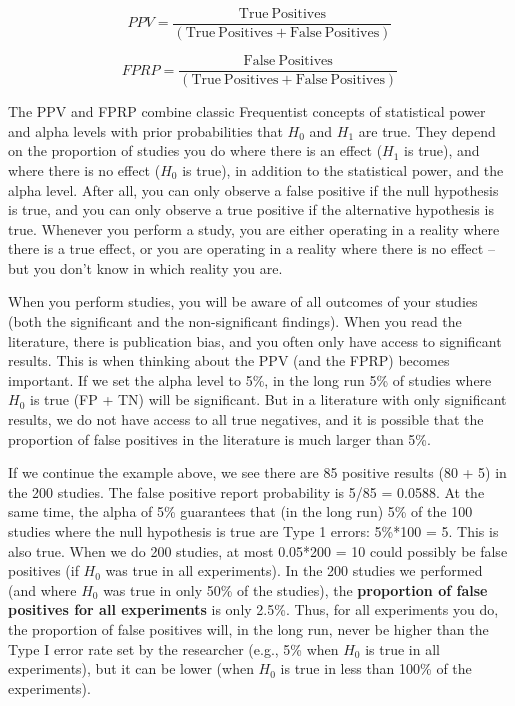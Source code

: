 \documentclass[
  oneside]{krantz}
\begin{document}
\[PPV = \frac{\text{True}\ \text{Positives}}{(\text{True}\ \text{Positives} +
                                                \text{False}\ \text{Positives})}\]

\[FPRP = \frac{\text{False}\ \text{Positives}}{(\text{True}\ \text{Positives}
                                                  + \text{False}\ \text{Positives})}\]

The PPV and FPRP combine classic Frequentist concepts of statistical power and alpha levels with prior probabilities that \(H_0\) and \(H_1\) are true. They depend on the proportion of studies you do where there is an effect (\(H_1\) is true), and where there is no effect (\(H_0\) is true), in addition to the statistical power, and the alpha level. After all, you can only observe a false positive if the null hypothesis is true, and you can only observe a true positive if the alternative hypothesis is true. Whenever you perform a study, you are either operating in a reality where there is a true effect, or you are operating in a reality where there is no effect -- but you don't know in which reality you are.

When you perform studies, you will be aware of all outcomes of your studies (both the significant and the non-significant findings). When you read the literature, there is publication bias, and you often only have access to significant results. This is when thinking about the PPV (and the FPRP) becomes important. If we set the alpha level to 5\%, in the long run 5\% of studies where \(H_0\) is true (FP + TN) will be significant. But in a literature with only significant results, we do not have access to all true negatives, and it is possible that the proportion of false positives in the literature is much larger than 5\%.

If we continue the example above, we see there are 85 positive results (80 + 5) in the 200 studies. The false positive report probability is 5/85 = 0.0588. At the same time, the alpha of 5\% guarantees that (in the long run) 5\% of the 100 studies where the null hypothesis is true are Type 1 errors: 5\%*100 = 5. This is also true. When we do 200 studies, at most 0.05*200 = 10 could possibly be false positives (if \(H_0\) was true in all experiments). In the 200 studies we performed (and where \(H_0\) was true in only 50\% of the studies), the \textbf{proportion of false positives for all experiments} is only 2.5\%. Thus, for all experiments you do, the proportion of false positives will, in the long run, never be higher than the Type I error rate set by the researcher (e.g., 5\% when \(H_0\) is true in all experiments), but it can be lower (when \(H_0\) is true in less than 100\% of the experiments).
\end{document}
